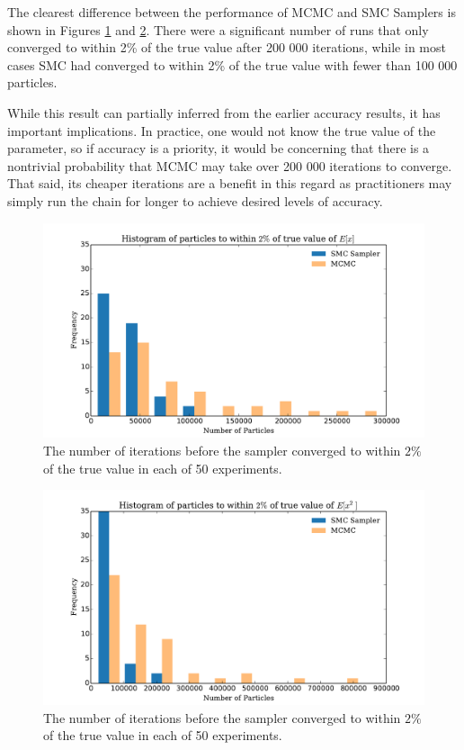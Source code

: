 \documentclass[12pt]{elsarticle}
\begin{document}
The clearest difference between the performance of MCMC and SMC Samplers is shown in Figures \ref{fig:itersEX} and \ref{fig:itersEX2}. There were a significant number of runs that only converged to within 2\% of the true value after 200 000 iterations, while in most cases SMC had converged to within 2\% of the true value with fewer than 100 000 particles. 

While this result can partially inferred from the earlier accuracy results, it has important implications. In practice, one would not know the true value of the parameter, so if accuracy is a priority, it would be concerning that there is a nontrivial probability that MCMC may take over 200 000 iterations to converge.  That said, its cheaper iterations are a benefit in this regard as practitioners may simply run the chain for longer to achieve desired levels of accuracy.

\begin{figure}[htbp]
\begin{center}
\includegraphics[width = \textwidth]{plots/iterations.pdf}
\caption{The number of iterations before the sampler converged to within $2\%$ of the true value in each of 50 experiments.}
\label{fig:itersEX}
\end{center}
\end{figure}

\begin{figure}[htbp]
\begin{center}
\includegraphics[width = \textwidth]{plots/iterationsEx2.pdf}
\caption{The number of iterations before the sampler converged to within $2\%$ of the true value in each of 50 experiments.}
\label{fig:itersEX2}
\end{center}
\end{figure}
\end{document}
